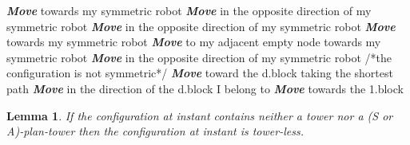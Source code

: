 \documentclass[12pt]{llncs}
\newtheorem{lem}{Lemma}
\begin{document}
\begin{algorithm}[H]
  \caption{Procedure Phase 1}
  \label{PH1.algo}
 \begin{algorithmic}[1]
    \If {}
                 \If {}
                         \State \textbf{\textit{Move}} towards my symmetric robot
                  \Else
                         \State \textbf{\textit{Move}} in the opposite direction of my symmetric robot
                  \EndIf
              \EndIf
          \Else
              \If {} 
                      \State \textbf{\textit{Move}} in the opposite direction of my symmetric robot
                  \EndIf
              \Else 
                       \State \textbf{\textit{Move}} towards my symmetric robot
                   \EndIf
              \EndIf
          \EndIf
      \Else
                \State \textbf{\textit{Move}} to my adjacent empty node towards my symmetric robot
            \EndIf
        \Else
                 \State \textbf{\textit{Move}} in the opposite direction of my symmetric robot
             \EndIf
       \EndIf
    \EndIf
\Else /*the configuration is not symmetric*/
              \State \textbf{\textit{Move}} toward the d.block taking the shortest path
          \EndIf
     \Else
             \If {}
                      \State \textbf{\textit{Move}} in the direction of the d.block I belong to
                 \EndIf
              \Else
                              \State \textbf{\textit{Move}} towards the 1.block
                          \EndIf
                     \EndIf
                \EndIf
\EndIf
\EndIf
\EndIf
\end{algorithmic}
\end{algorithm}  



\begin{lem}
If the configuration at instant  contains neither a tower nor a (S or A)-plan-tower then the configuration at instant  is tower-less.
\end{lem}
\end{document}
